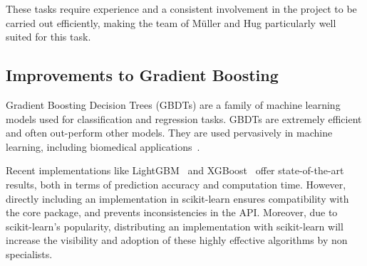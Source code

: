 \documentclass[11pt]{article}  %
\begin{document}
These tasks require experience and a consistent involvement in the project
to be carried out efficiently, making the team of M\"uller and Hug
particularly well suited for this task.

\subsection{Improvements to Gradient Boosting}

Gradient Boosting Decision Trees (GBDTs) are a family of machine learning
models used for classification and regression tasks. GBDTs are extremely
efficient and often out-perform other models. They are used pervasively in
machine learning, including biomedical applications~\cite{chen2019hiv, shah2019development}.

Recent implementations like LightGBM~\cite{LightGBM} and XGBoost~\cite{XGB}
offer state-of-the-art results, both in terms of prediction accuracy and
computation time. However, directly including an implementation in scikit-learn ensures compatibility with the core package, and prevents inconsistencies in the API. Moreover, due to scikit-learn's popularity, distributing an implementation with scikit-learn will increase the visibility and adoption of these highly effective algorithms by non specialists.
\end{document}
